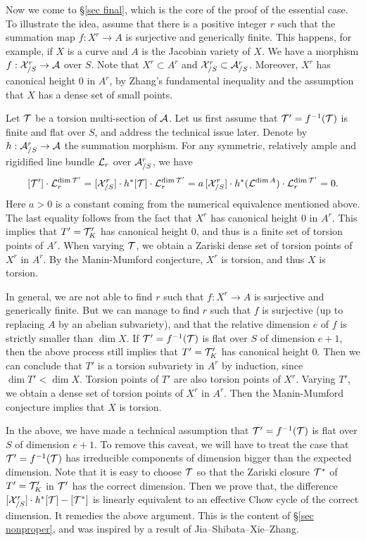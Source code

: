 Now we come to \S\ref{sec final}, which is the core of the proof of the essential case.
To illustrate the idea, assume that there is a positive integer $r$ such that the summation map $f:X^r\to A$ is surjective and generically finite. This happens, for example, if $X$ is a curve and $A$ is the Jacobian variety of $X$.
We have a morphism $f:{\mathcal X}_{/S}^r\to {\mathcal A}$ over $S$.
Note that $X^r\subset A^r$ and ${\mathcal X}_{/S}^r\subset {\mathcal A}_{/S}^r$.
Moreover, $X^r$ has canonical height 0 in $A^r$, by Zhang's fundamental inequality and the assumption that $X$ has a dense set of small points.

Let ${\mathcal T}$ be a torsion multi-section of ${\mathcal A}$.
Let us first assume that ${\mathcal T}'=f^{-1}({\mathcal T})$ is finite and flat over $S$, and address the technical issue later.
Denote by $h:{\mathcal A}_{/S}^r\to {\mathcal A}$ the summation morphism.
For any symmetric, relatively ample and rigidified line bundle
${\mathcal L}_r$ over ${\mathcal A}_{/S}^r$, we have
$$
[{\mathcal T}']\cdot {\mathcal L}_r^{\dim {\mathcal T}'}=[{\mathcal X}_{/S}^r] \cdot h^*[{\mathcal T}]\cdot {\mathcal L}_r^{\dim {\mathcal T}'}
=a\, [{\mathcal X}_{/S}^r] \cdot h^*({\mathcal L}^{\dim A})\cdot {\mathcal L}_r^{\dim {\mathcal T}'}
=0.
$$
Here $a>0$ is a constant coming from the numerical equivalence mentioned above.
The last equality follows from the fact that $X^r$ has canonical height 0 in $A^r$.
This implies that $T'={\mathcal T}'_K$ has canonical height 0, and thus is a finite set of torsion points of $A^r$.
When varying ${\mathcal T}$, we obtain a Zariski dense set of torsion points of $X^r$ in $A^r$.
By the Manin-Mumford conjecture, $X^r$ is torsion, and thus $X$ is torsion.

In general, we are not able to find $r$ such that $f:X^r\to A$ is surjective and generically finite.
But we can manage to find $r$ such that $f$ is surjective (up to replacing $A$ by an abelian subvariety), and that the relative dimension $e$ of $f$ is strictly smaller than $\dim X$.
If ${\mathcal T}'=f^{-1}({\mathcal T})$ is flat over $S$ of dimension $e+1$, then the above process still implies that $T'={\mathcal T}'_K$ has canonical height 0.
Then we can conclude that $T'$ is a torsion subvariety in $A^r$ by induction, since $\dim T'<\dim X$.
Torsion points of $T'$ are also torsion points of $X^r$.
Varying $T'$, we obtain a dense set of torsion points of $X^r$ in $A^r$.
Then the Manin-Mumford conjecture implies that $X$ is torsion.


In the above, we have made a technical assumption that ${\mathcal T}'=f^{-1}({\mathcal T})$ is flat over $S$ of dimension $e+1$.
To remove this caveat, we will have to treat the case that ${\mathcal T}'=f^{-1}({\mathcal T})$ has irreducible components of dimension bigger than the expected dimension. Note that it is easy to choose ${\mathcal T}$ so that the Zariski closure ${\mathcal T}^*$ of $T'={\mathcal T}'_K$ in ${\mathcal T}'$ has the correct dimension.
Then we prove that, the difference $[{\mathcal X}_{/S}^r] \cdot h^*[{\mathcal T}]-[{\mathcal T}^*]$ is linearly equivalent to an effective Chow cycle of the correct dimension.
It remedies the above argument.
This is the content of \S\ref{sec nonproper}, and was inspired by a result of Jia--Shibata--Xie--Zhang.


